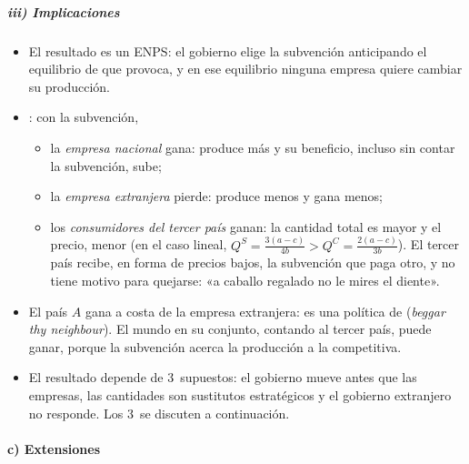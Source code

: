 \documentclass[11pt]{article}
\begin{document}
\subparagraph{iii) Implicaciones}

\begin{itemize}
\item El resultado es un ENPS: el gobierno elige la subvención anticipando el equilibrio de  que provoca, y en ese equilibrio ninguna empresa quiere cambiar su producción.
\item {}: con la subvención,
  \begin{itemize}
  \item la \emph{empresa nacional} gana: produce más y su beneficio, incluso sin contar la subvención, sube;
  \item la \emph{empresa extranjera} pierde: produce menos y gana menos;
  \item los \emph{consumidores del tercer país} ganan: la cantidad total es mayor y el precio, menor (en el caso lineal, $Q^S=\frac{3(a-c)}{4b}>Q^C=\frac{2(a-c)}{3b}$). El tercer país recibe, en forma de precios bajos, la subvención que paga otro, y no tiene motivo para quejarse: «a caballo regalado no le mires el diente».
  \end{itemize}
\item El país $A$ gana a costa de la empresa extranjera: es una política de  (\emph{beggar thy neighbour}). El mundo en su conjunto, contando al tercer país, puede ganar, porque la subvención acerca la producción a la competitiva.
\item El resultado depende de 3~supuestos: el gobierno mueve antes que las empresas, las cantidades son sustitutos estratégicos y el gobierno extranjero no responde. Los 3~se discuten a continuación.
\end{itemize}

\paragraph{c) Extensiones}
\end{document}
